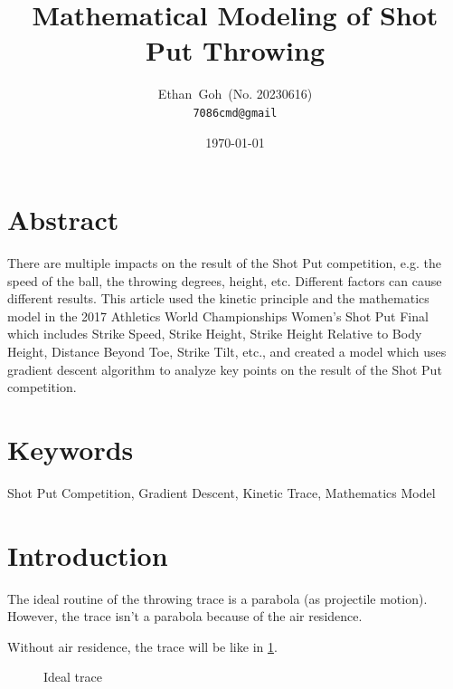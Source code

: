 \documentclass{article}
\title{Mathematical Modeling of Shot Put Throwing}
\author{Ethan\ Goh\ (No. 20230616)\\\texttt{7086cmd@gmail}}
\date{\today}
\begin{document}
\maketitle
\section*{Abstract}
There are multiple impacts on the result of the Shot Put competition, e.g. the speed of the ball, the throwing degrees, height, etc. Different factors can cause different results. This article used the kinetic principle and the mathematics model in the 2017 Athletics World Championships Women's Shot Put Final which includes Strike Speed, Strike Height, Strike Height Relative to Body Height, Distance Beyond Toe, Strike Tilt, etc., and created a model which uses gradient descent algorithm to analyze key points on the result of the Shot Put competition.

\section*{Keywords} Shot Put Competition, Gradient Descent, Kinetic Trace, Mathematics Model

\newpage

\tableofcontents

\newpage

\section{Introduction}

The ideal routine of the throwing trace is a parabola (as projectile motion). However, the trace isn't a parabola because of the air residence.

Without air residence, the trace will be like in \ref{fig:ideal-trace}.

\begin{figure}[H]
    \centering
    \caption{Ideal trace}
    \label{fig:ideal-trace}
\end{figure}
\end{document}
